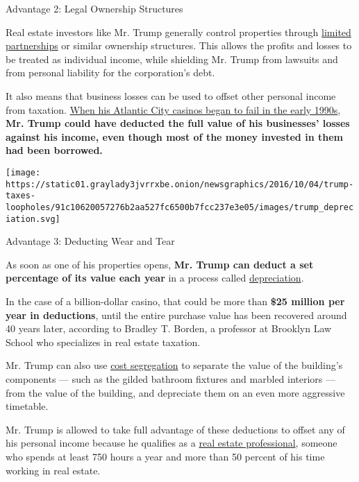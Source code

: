 Advantage 2: Legal Ownership Structures

Real estate investors like Mr. Trump generally control properties
through
\href{https://www.irs.gov/businesses/small-businesses-self-employed/partnerships}{limited
partnerships} or similar ownership structures. This allows the profits
and losses to be treated as individual income, while shielding Mr. Trump
from lawsuits and from personal liability for the corporation's debt.

It also means that business losses can be used to offset other personal
income from taxation.
\href{http://www.nytimes3xbfgragh.onion/2016/06/12/nyregion/donald-trump-atlantic-city.html}{When
his Atlantic City casinos began to fail in the early 1990s}, \textbf{Mr.
Trump could have deducted the full value of his businesses' losses
against his income, even though most of the money invested in them had
been borrowed.}

\texttt{[image: https://static01.graylady3jvrrxbe.onion/newsgraphics/2016/10/04/trump-taxes-loopholes/91c10620057276b2aa527fc6500b7fcc237e3e05/images/trump\_depreciation.svg]}

Advantage 3: Deducting Wear and Tear

As soon as one of his properties opens, \textbf{Mr. Trump can deduct a
set percentage of its value each year} in a process called
\href{https://www.irs.gov/publications/p946/index.html}{depreciation}.

In the case of a billion-dollar casino, that could be more than
\textbf{\$25 million per year in deductions}, until the entire purchase
value has been recovered around 40 years later, according to Bradley T.
Borden, a professor at Brooklyn Law School who specializes in real
estate taxation.

Mr. Trump can also use
\href{https://www.irs.gov/businesses/cost-segregation-audit-techniques-guide-chapter-1-introduction}{cost
segregation} to separate the value of the building's components --- such
as the gilded bathroom fixtures and marbled interiors --- from the value
of the building, and depreciate them on an even more aggressive
timetable.

Mr. Trump is allowed to take full advantage of these deductions to
offset any of his personal income because he qualifies as a
\href{https://www.irs.gov/businesses/small-businesses-self-employed/passive-activity-loss-atg-exhibit-2-4-real-estate-professionals}{real
estate professional}, someone who spends at least 750 hours a year and
more than 50 percent of his time working in real estate.


